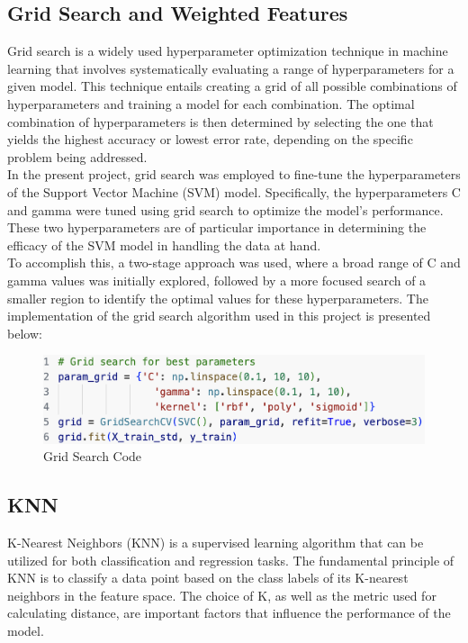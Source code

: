 \documentclass[conference]{IEEEtran}
\begin{document}
\subsection{Grid Search and Weighted Features}
Grid search is a widely used hyperparameter optimization technique in machine learning that involves systematically evaluating a range of hyperparameters for a given model. This technique entails creating a grid of all possible combinations of hyperparameters and training a model for each combination. The optimal combination of hyperparameters is then determined by selecting the one that yields the highest accuracy or lowest error rate, depending on the specific problem being addressed.\\
In the present project, grid search was employed to fine-tune the hyperparameters of the Support Vector Machine (SVM) model. Specifically, the hyperparameters C and gamma were tuned using grid search to optimize the model's performance. These two hyperparameters are of particular importance in determining the efficacy of the SVM model in handling the data at hand.\cite{b5}\\
To accomplish this, a two-stage approach was used, where a broad range of C and gamma values was initially explored, followed by a more focused search of a smaller region to identify the optimal values for these hyperparameters. The implementation of the grid search algorithm used in this project is presented below:
	\begin{figure}[h]
	\label{fig:foo}
	\begin{center}
	\includegraphics[scale=0.35]{gridSearch.png}
	\caption{Grid Search Code}
	\end{center}
	\end{figure}
	
\subsection{KNN}
K-Nearest Neighbors (KNN) is a supervised learning algorithm that can be utilized for both classification and regression tasks. The fundamental principle of KNN is to classify a data point based on the class labels of its K-nearest neighbors in the feature space. The choice of K, as well as the metric used for calculating distance, are important factors that influence the performance of the model.\cite{b6}\\
\end{document}

